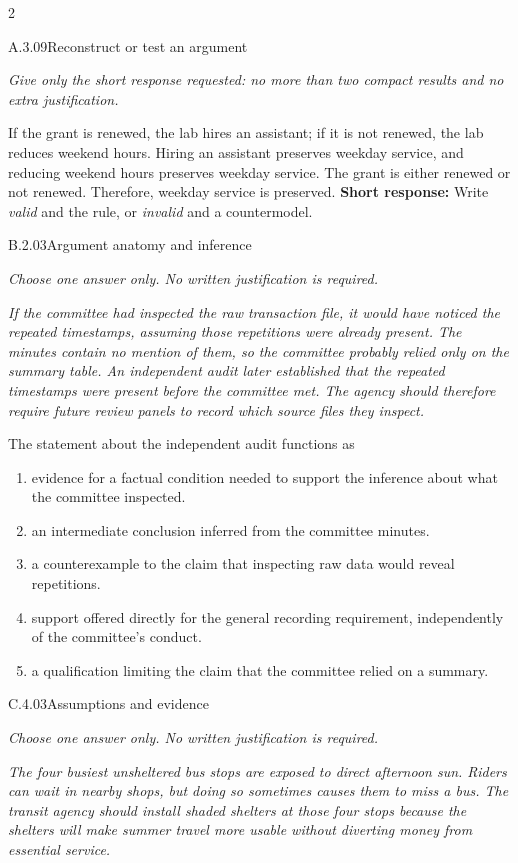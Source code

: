 \documentclass[9pt]{extarticle}
\newcommand{\choice}[1]{\item #1}
\begin{document}
\begin{multicols}{2}
\begin{DenseCoreProblem}{A.3.09}{Reconstruct or test an argument}
{\scriptsize\textit{Give only the short response requested: no more than two compact results and no extra justification.}\par}
If the grant is renewed, the lab hires an assistant; if it is not renewed, the lab reduces weekend hours. Hiring an assistant preserves weekday service, and reducing weekend hours preserves weekday service. The grant is either renewed or not renewed. Therefore, weekday service is preserved.
\textbf{Short response:} Write \emph{valid} and the rule, or \emph{invalid} and a countermodel.
\end{DenseCoreProblem}
\begin{DenseCoreProblem}{B.2.03}{Argument anatomy and inference}
{\scriptsize\textit{Choose one answer only. No written justification is required.}\par}
\emph{If the committee had inspected the raw transaction file, it would have noticed the repeated timestamps, assuming those repetitions were already present. The minutes contain no mention of them, so the committee probably relied only on the summary table. An independent audit later established that the repeated timestamps were present before the committee met. The agency should therefore require future review panels to record which source files they inspect.}

The statement about the independent audit functions as
\begin{enumerate}[label=(\alph*)]
  \choice{evidence for a factual condition needed to support the inference about what the committee inspected.}
  \choice{an intermediate conclusion inferred from the committee minutes.}
  \choice{a counterexample to the claim that inspecting raw data would reveal repetitions.}
  \choice{support offered directly for the general recording requirement, independently of the committee's conduct.}
  \choice{a qualification limiting the claim that the committee relied on a summary.}
\end{enumerate}
\end{DenseCoreProblem}
\columnbreak
\begin{DenseCoreProblem}{C.4.03}{Assumptions and evidence}
{\scriptsize\textit{Choose one answer only. No written justification is required.}\par}
\emph{The four busiest unsheltered bus stops are exposed to direct afternoon sun. Riders can wait in nearby shops, but doing so sometimes causes them to miss a bus. The transit agency should install shaded shelters at those four stops because the shelters will make summer travel more usable without diverting money from essential service.}


\end{DenseCoreProblem}
\end{multicols}
\end{document}
